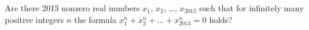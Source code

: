 \problem{}
Are there 2013 nonzero real numbers
$x_1$, $x_2$, \ldots, $x_{2013}$ such
that for infinitely many positive integers $n$ the formula $x_1 ^ n + x_2 ^ n + \ldots + x_ {2013} ^ n = 0$ holds?

\solution

\endproblem
